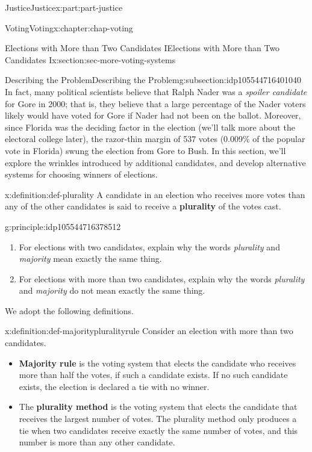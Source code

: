 \documentclass[oneside,10pt,]{book}
\newcommand{\terminology}[1]{\textbf{#1}}
\numberwithin{equation}{section}
\begin{document}
\begin{partptx}{Justice}{}{Justice}{}{}{x:part:part-justice}
\begin{chapterptx}{Voting}{}{Voting}{}{}{x:chapter:chap-voting}
\begin{sectionptx}{Elections with More than Two Candidates I}{}{Elections with More than Two Candidates I}{}{}{x:section:sec-more-voting-systems}
\begin{subsectionptx}{Describing the Problem}{}{Describing the Problem}{}{}{g:subsection:idp105544716401040}
 In fact, many political scientists believe that Ralph Nader was a \emph{spoiler candidate} for Gore in 2000; that is, they believe that a large percentage of the Nader voters likely would have voted for Gore if Nader had not been on the ballot. Moreover, since Florida was the deciding factor in the election (we'll talk more about the electoral college later), the razor-thin margin of 537 votes (0.009\% of the popular vote in Florida) swung the election from Gore to Bush. In this section, we'll explore the wrinkles introduced by additional candidates, and develop alternative systems for choosing winners of elections.%
\begin{definition}{}{x:definition:def-plurality}%
%
A candidate in an election who receives more votes than any of the other candidates is said to receive a \terminology{plurality} of the votes cast.%
\end{definition}
\begin{principle}{}{}{g:principle:idp105544716378512}%
%
\begin{enumerate}
\item{}For elections with two candidates, explain why the words \emph{plurality} and \emph{majority} mean exactly the same thing.%
\item{}For elections with more than two candidates, explain why the words \emph{plurality} and \emph{majority} do not mean exactly the same thing.%
\end{enumerate}
\end{principle}
We adopt the following definitions.%
\begin{definition}{}{x:definition:def-majoritypluralityrule}%
%
%
%
Consider an election with more than two candidates.%
%
\begin{itemize}[label=\textbullet]
\item{}\terminology{Majority rule} is the voting system that elects the candidate who receives more than half the votes, if such a candidate exists. If no such candidate exists, the election is declared a tie with no winner.%
\item{}The \terminology{plurality method} is the voting system that elects the candidate that receives the largest number of votes. The plurality method only produces a tie when two candidates receive exactly the same number of votes, and this number is more than any other candidate.%
\end{itemize}

\end{definition}
\end{subsectionptx}
\end{sectionptx}
\end{chapterptx}
\end{partptx}
\end{document}
